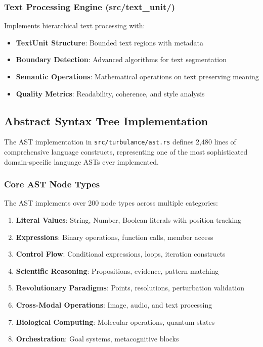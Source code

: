 \documentclass[12pt,a4paper,twoside]{article}
\begin{document}
\begin{itemize}
\subsubsection{Text Processing Engine (src/text\_unit/)}

Implements hierarchical text processing with:

\begin{itemize}
\item \textbf{TextUnit Structure}: Bounded text regions with metadata
\item \textbf{Boundary Detection}: Advanced algorithms for text segmentation
\item \textbf{Semantic Operations}: Mathematical operations on text preserving meaning
\item \textbf{Quality Metrics}: Readability, coherence, and style analysis
\end{itemize}

\subsection{Abstract Syntax Tree Implementation}

The AST implementation in \texttt{src/turbulance/ast.rs} defines 2,480 lines of comprehensive language constructs, representing one of the most sophisticated domain-specific language ASTs ever implemented.

\subsubsection{Core AST Node Types}

The AST implements over 200 node types across multiple categories:

\begin{enumerate}
\item \textbf{Literal Values}: String, Number, Boolean literals with position tracking
\item \textbf{Expressions}: Binary operations, function calls, member access
\item \textbf{Control Flow}: Conditional expressions, loops, iteration constructs
\item \textbf{Scientific Reasoning}: Propositions, evidence, pattern matching
\item \textbf{Revolutionary Paradigms}: Points, resolutions, perturbation validation
\item \textbf{Cross-Modal Operations}: Image, audio, and text processing
\item \textbf{Biological Computing}: Molecular operations, quantum states
\item \textbf{Orchestration}: Goal systems, metacognitive blocks
\end{enumerate}


\end{itemize}
\end{document}
